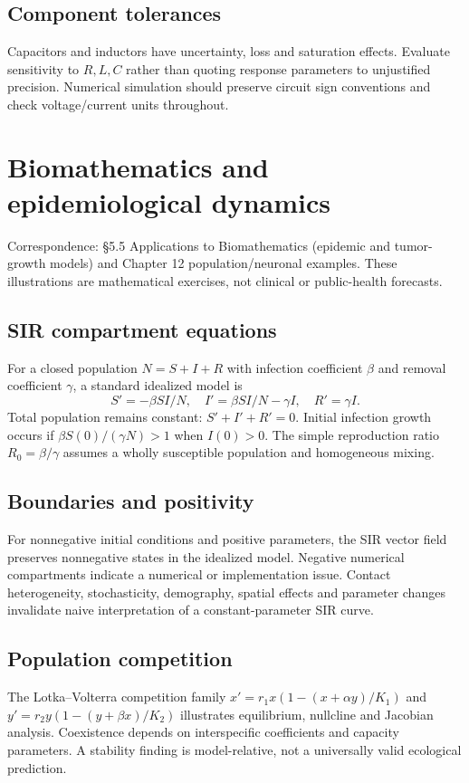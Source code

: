 \documentclass[11pt,letterpaper,oneside]{report}
\theoremstyle{definition}\newtheorem{definition}[theorem]{Definition}
\theoremstyle{remark}\newtheorem{remark}[theorem]{Remark}
\begin{document}
\section{Component tolerances}
Capacitors and inductors have uncertainty, loss and saturation effects. Evaluate sensitivity to $R,L,C$ rather than quoting response parameters to unjustified precision. Numerical simulation should preserve circuit sign conventions and check voltage/current units throughout.
\chapter{Biomathematics and epidemiological dynamics}
\begin{bookground}Correspondence: \S5.5 Applications to Biomathematics (epidemic and tumor-growth models) and Chapter 12 population/neuronal examples. These illustrations are mathematical exercises, not clinical or public-health forecasts.\end{bookground}
\section{SIR compartment equations}
For a closed population $N=S+I+R$ with infection coefficient $\beta$ and removal coefficient $\gamma$, a standard idealized model is
\[S'=-\beta SI/N,\quad I'=\beta SI/N-\gamma I,\quad R'=\gamma I.\]
Total population remains constant: $S'+I'+R'=0$. Initial infection growth occurs if $\beta S(0)/(\gamma N)>1$ when $I(0)>0$. The simple reproduction ratio $R_0=\beta/\gamma$ assumes a wholly susceptible population and homogeneous mixing.
\section{Boundaries and positivity}
For nonnegative initial conditions and positive parameters, the SIR vector field preserves nonnegative states in the idealized model. Negative numerical compartments indicate a numerical or implementation issue. Contact heterogeneity, stochasticity, demography, spatial effects and parameter changes invalidate naive interpretation of a constant-parameter SIR curve.
\section{Population competition}
The Lotka--Volterra competition family $x'=r_1x(1-(x+\alpha y)/K_1)$ and $y'=r_2y(1-(y+\beta x)/K_2)$ illustrates equilibrium, nullcline and Jacobian analysis. Coexistence depends on interspecific coefficients and capacity parameters. A stability finding is model-relative, not a universally valid ecological prediction.
\end{document}
